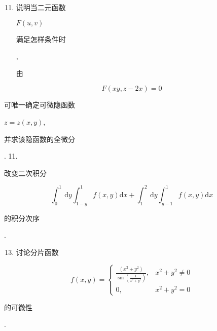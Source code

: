 \documentclass[10pt]{article}
\begin{document}
\begin{enumerate}
  \setcounter{enumi}{10}
  \item \begin{CJK}{UTF8}{mj}说明当二元函数\end{CJK} $F(u, v)$ \begin{CJK}{UTF8}{mj}满足怎样条件时\end{CJK}, \begin{CJK}{UTF8}{mj}由\end{CJK}
\end{enumerate}
$$
F(x y, z-2 x)=0
$$
\begin{CJK}{UTF8}{mj}可唯一确定可微隐函数\end{CJK} $z=z(x, y)$, \begin{CJK}{UTF8}{mj}并求该隐函数的全微分\end{CJK}. 11. \begin{CJK}{UTF8}{mj}改变二次积分\end{CJK}
$$
\int_{0}^{1} \mathrm{~d} y \int_{1-y}^{1} f(x, y) \mathrm{d} x+\int_{1}^{2} \mathrm{~d} y \int_{y-1}^{1} f(x, y) \mathrm{d} x
$$
\begin{CJK}{UTF8}{mj}的积分次序\end{CJK}.

\begin{enumerate}
  \setcounter{enumi}{12}
  \item \begin{CJK}{UTF8}{mj}讨论分片函数\end{CJK}
\end{enumerate}
$$
f(x, y)= \begin{cases}\frac{\left(x^{2}+y^{2}\right)}{\sin \left(\frac{1}{x^{2}+y^{2}}\right)}, & x^{2}+y^{2} \neq 0 \\ 0, & x^{2}+y^{2}=0\end{cases}
$$
\begin{CJK}{UTF8}{mj}的可微性\end{CJK}.
\end{document}
